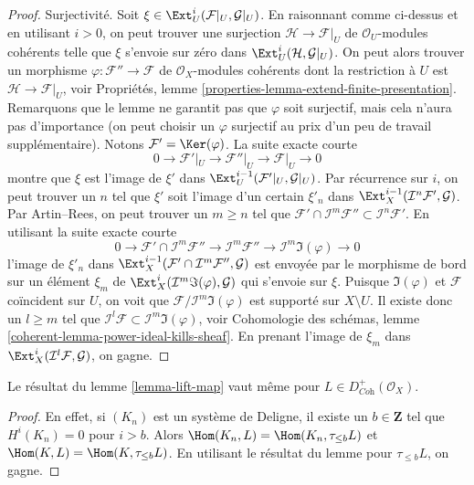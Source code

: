 \begin{proof}
\medskip\noindent
Surjectivité. Soit $\xi \in \Ext^i_U(\mathcal{F}|_U, \mathcal{G}|_U)$. En raisonnant comme ci-dessus et en utilisant $i > 0$, on peut trouver une surjection $\mathcal{H} \to \mathcal{F}|_U$ de $\mathcal{O}_U$-modules cohérents telle que $\xi$ s'envoie sur zéro dans $\Ext^i_U(\mathcal{H}, \mathcal{G}|_U)$. On peut alors trouver un morphisme $\varphi : \mathcal{F}'' \to \mathcal{F}$ de $\mathcal{O}_X$-modules cohérents dont la restriction à $U$ est $\mathcal{H} \to \mathcal{F}|_U$, voir Propriétés, lemme \ref{properties-lemma-extend-finite-presentation}. Remarquons que le lemme ne garantit pas que $\varphi$ soit surjectif, mais cela n'aura pas d'importance (on peut choisir un $\varphi$ surjectif au prix d'un peu de travail supplémentaire). Notons $\mathcal{F}' = \Ker(\varphi)$. La suite exacte courte
$$
0 \to \mathcal{F}'|_U \to \mathcal{F}''|_U \to \mathcal{F}|_U \to 0
$$
montre que $\xi$ est l'image de $\xi'$ dans $\Ext^{i - 1}_U(\mathcal{F}'|_U, \mathcal{G}|_U)$. Par récurrence sur $i$, on peut trouver un $n$ tel que $\xi'$ soit l'image d'un certain $\xi'_n$ dans $\Ext^{i - 1}_X(\mathcal{I}^n\mathcal{F}', \mathcal{G})$. Par Artin–Rees, on peut trouver un $m \geq n$ tel que $\mathcal{F}' \cap \mathcal{I}^m\mathcal{F}'' \subset
\mathcal{I}^n\mathcal{F}'$. En utilisant la suite exacte courte
$$
0 \to \mathcal{F}' \cap \mathcal{I}^m\mathcal{F}'' \to
\mathcal{I}^m\mathcal{F}'' \to \mathcal{I}^m\Im(\varphi) \to 0
$$
l'image de $\xi'_n$ dans
$\Ext^{i - 1}_X(\mathcal{F}' \cap \mathcal{I}^m\mathcal{F}'', \mathcal{G})$
est envoyée par le morphisme de bord sur un élément $\xi_m$ de $\Ext^i_X(\mathcal{I}^m\Im(\varphi), \mathcal{G})$ qui s'envoie sur $\xi$. Puisque $\Im(\varphi)$ et $\mathcal{F}$ coïncident sur $U$, on voit que $\mathcal{F}/\mathcal{I}^m\Im(\varphi)$ est supporté sur $X \setminus U$. Il existe donc un $l \geq m$ tel que $\mathcal{I}^l\mathcal{F} \subset \mathcal{I}^m\Im(\varphi)$, voir Cohomologie des schémas, lemme \ref{coherent-lemma-power-ideal-kills-sheaf}. En prenant l'image de $\xi_m$ dans $\Ext^i_X(\mathcal{I}^l\mathcal{F}, \mathcal{G})$, on gagne.
\end{proof}

\begin{lemma}
\label{lemma-lift-map-plus}
Le résultat du lemme \ref{lemma-lift-map} vaut même pour $L \in D^+_{\textit{Coh}}(\mathcal{O}_X)$.
\end{lemma}

\begin{proof}
En effet, si $(K_n)$ est un système de Deligne, il existe un $b \in \mathbf{Z}$ tel que $H^i(K_n) = 0$ pour $i > b$. Alors $\Hom(K_n, L) = \Hom(K_n, \tau_{\leq b}L)$ et $\Hom(K, L) = \Hom(K, \tau_{\leq b}L)$. En utilisant le résultat du lemme pour $\tau_{\leq b}L$, on gagne.
\end{proof}

